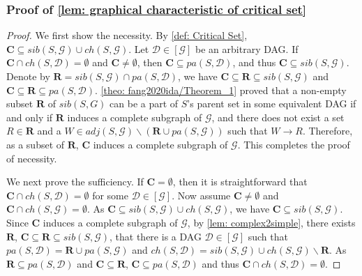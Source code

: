 \documentclass{article}
\begin{document}
\subsubsection{Proof of \cref{lem: graphical characteristic of critical set}}
\begin{proof}
    We first show the necessity. By \cref{def: Critical Set}, $\mathbf{C} \subseteq sib(S,\mathcal{G}) \cup ch(S,\mathcal{G})$. Let $\mathcal{D} \in [\mathcal{G}]$ be an arbitrary DAG. If $\mathbf{C} \cap{ch(S, \mathcal{D})} = \emptyset$ and $\mathbf{C} \ne \emptyset$, then $\mathbf{C} \subseteq pa(S, \mathcal{D})$, and thus $\mathbf{C} \subseteq sib(S,\mathcal{G})$. Denote by $\mathbf{R} = sib(S, \mathcal{G}) \cap pa(S,\mathcal{D})$, we have $\mathbf{C} \subseteq{\mathbf{R}} \subseteq{sib(S,\mathcal{G})}$ and $\mathbf{C} \subseteq{\mathbf{R}} \subseteq{pa(S,\mathcal{D})}$. \cref{theo: fang2020ida/Theorem_1} proved that a non-empty subset $\mathbf{R}$ of $sib(S,G)$ can be a part of $S$'s parent set in some equivalent DAG if and only if $\mathbf{R}$ induces a complete subgraph of $\mathcal{G}$, and there does not exist a set $R \in \mathbf{R}$ and a $W \in adj(S,\mathcal{G})\backslash (\mathbf{R} \cup pa(S,\mathcal{G}))$ such that $W \rightarrow R$. Therefore, as a subset of $\mathbf{R}$, $\mathbf{C}$ induces a complete subgraph of $\mathcal{G}$. This completes the proof of necessity.
    
    We next prove the sufficiency. If $\mathbf{C}=\emptyset$, then it is straightforward that $\mathbf{C} \cap{ch(S, \mathcal D)} = \emptyset$ for some $\mathcal{D} \in [\mathcal{G}]$. Now assume $\mathbf{C} \ne \emptyset$ and $\mathbf{C} \cap{ch(S, \mathcal G)} = \emptyset$. As $\mathbf{C} \subseteq sib(S,\mathcal{G}) \cup ch(S,\mathcal{G})$, we have $\mathbf{C} \subseteq sib(S,\mathcal{G})$. Since $\mathbf{C}$ induces a complete subgraph of $\mathcal{G}$, by \cref{lem: complex2simple}, there exists $\mathbf{R}$, $\mathbf{C} \subseteq{\mathbf{R}} \subseteq{sib(S,\mathcal{G})}$, that there is a DAG $\mathcal{D} \in [\mathcal{G}]$ such that $pa(S,\mathcal{D})=\mathbf{R} \cup pa(S,\mathcal{G})$ and $ch(S,\mathcal{D})=sib(S,\mathcal{G}) \cup ch(S, \mathcal{G}) \backslash \mathbf{R}$. As $\mathbf{R} \subseteq pa(S,\mathcal{D})$ and $\mathbf{C} \subseteq{\mathbf{R}}$, $\mathbf{C} \subseteq pa(S,\mathcal{D})$ and thus $\mathbf{C} \cap{ch(S, \mathcal{D})} = \emptyset$.
\end{proof}
\end{document}
